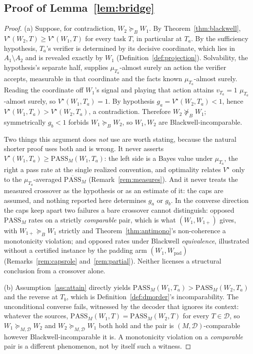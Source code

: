\documentclass[11pt]{article}
\theoremstyle{plain}
\theoremstyle{definition}
\theoremstyle{remark}
\newcommand{\PASS}{\mathrm{PASS}}
\newcommand{\Dcal}{\mathcal{D}}
\newcommand{\Bord}{\succeq_{B}}
\begin{document}
\subsection*{Proof of Lemma~\ref{lem:bridge}}
\begin{proof}
\textup{(a)} Suppose, for contradiction, $W_2 \Bord W_1$. By Theorem~\ref{thm:blackwell},
$V^\star(W_2, T) \ge V^\star(W_1, T)$ for every task $T$, in particular at $T_a$. By the
sufficiency hypothesis, $T_a$'s verifier is determined by its decisive coordinate, which lies in
$A_1\setminus A_2$ and is revealed exactly by $W_1$ (Definition~\ref{def:projection}). Solvability,
the hypothesis's separate half, supplies $\mu_{T_a}$-almost surely an action the verifier accepts,
measurable in that coordinate and the facts known $\mu_{T_a}$-almost surely. Reading the coordinate
off $W_1$'s signal and playing that action attains $v_{T_a}=1$ $\mu_{T_a}$-almost surely, so
$V^\star(W_1,T_a)=1$. By hypothesis $g_a = V^\star(W_2,T_a) < 1$, hence
$V^\star(W_1,T_a) > V^\star(W_2,T_a)$, a contradiction. Therefore $W_2 \not\Bord W_1$;
symmetrically $g_b < 1$ forbids $W_1 \Bord W_2$, so $W_1, W_2$ are Blackwell-incomparable.

Two things this argument does \emph{not} use are worth stating, because the natural shorter proof
uses both and is wrong. It never asserts $V^\star(W_1,T_a) \ge \PASS_M(W_1,T_a)$: the left side is
a Bayes value under $\mu_{T_a}$, the right a pass rate at the single realized convention, and
optimality relates $V^\star$ only to the $\mu_{T_a}$-averaged $\overline{\PASS}_M$
(Remark~\ref{rem:measures}). And it never treats the measured crossover as the hypothesis or as an
estimate of it: the caps are assumed, and nothing reported here determines $g_a$ or $g_b$. In the
converse direction the caps keep apart two failures a bare crossover cannot distinguish: opposed
$\PASS_M$ rates on a strictly \emph{comparable} pair, which is what $(W_1, W_{1+})$ gives, with
$W_{1+} \Bord W_1$ strictly and Theorem~\ref{thm:antimono}'s non-coherence a monotonicity
violation; and opposed rates under Blackwell \emph{equivalence}, illustrated without a certified
instance by the padding arm $(W_1, W_{\mathrm{pad}})$ (Remarks~\ref{rem:capsrole}
and~\ref{rem:partial}). Neither licenses a structural conclusion from a crossover alone.

\textup{(b)} Assumption~\ref{ass:attain} directly yields $\PASS_M(W_1,T_a) > \PASS_M(W_2,T_a)$
and the reverse at $T_b$, which is Definition~\ref{def:dmorder}'s incomparability. The
unconditional converse fails, witnessed by the decoder that ignores its context: whatever the
sources, $\PASS_M(W_1,T) = \PASS_M(W_2,T)$ for every $T \in \Dcal$, so $W_1 \succeq_{M,\Dcal} W_2$
and $W_2 \succeq_{M,\Dcal} W_1$ both hold and the pair is $(M,\Dcal)$-comparable however
Blackwell-incomparable it is. A monotonicity violation on a \emph{comparable} pair is a different
phenomenon, not by itself such a witness.
\end{proof}
\end{document}
